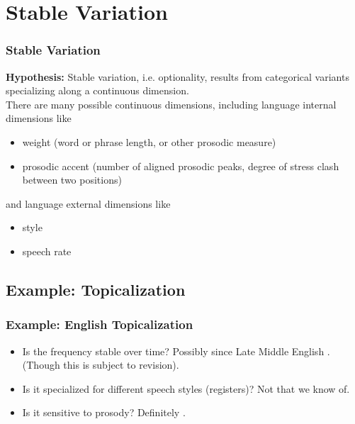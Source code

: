\documentclass[hyperref={pdfpagelabels=false}]{beamer}
\begin{document}
\section{Stable Variation}
\begin{frame}
\frametitle{Stable Variation}
\textbf{Hypothesis:} Stable variation, i.e. optionality, results from categorical variants specializing along a continuous dimension.\\
\vspace{4mm}
There are many possible continuous dimensions, including language internal dimensions like
	\begin{itemize}
		\item weight (word or phrase length, or other prosodic measure)
		\item prosodic accent (number of aligned prosodic peaks, degree of stress clash between two positions)
	\end{itemize}
and language external dimensions like
	\begin{itemize}
		\item style
		\item speech rate
	\end{itemize}
\end{frame}

\subsection{Example: Topicalization}
\begin{frame}
\frametitle{Example: English Topicalization}

\begin{itemize}
	\item Is the frequency stable over time? Possibly since Late Middle English \citep{speyer2010}. (Though this is subject to revision).
	\item Is it specialized for different speech styles (registers)? Not that we know of.
	\item Is it sensitive to prosody? Definitely \citep{speyer2008, speyer2010}.
\end{itemize}
\end{frame}
\end{document}
